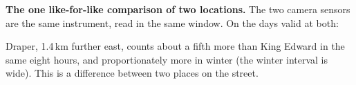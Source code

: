 \documentclass[11pt,a4paper]{article}
\begin{document}
\textbf{The one like-for-like comparison of two locations.} The two camera sensors are the same instrument, read in the same window. On the days valid at both:
\begin{center}\small{}\end{center}
Draper, 1.4\,km further east, counts about a fifth more than King Edward in the same eight hours, and proportionately more in winter (the winter interval is wide). This is a difference between two places on the street.
\end{document}
